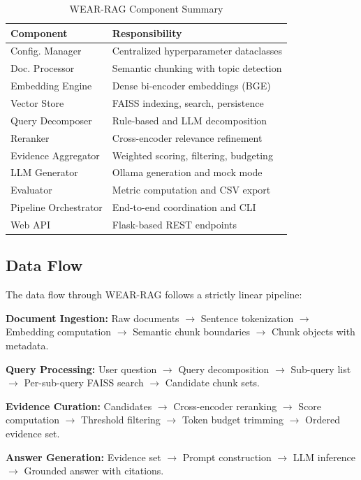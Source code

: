 \documentclass[conference]{IEEEtran}
\begin{document}
\begin{table}[!ht]
\centering
\caption{WEAR-RAG Component Summary}
\label{tab:modules}
\footnotesize
\begin{tabular}{p{2.2cm} p{4.8cm}}
\toprule
\textbf{Component} & \textbf{Responsibility} \\
\midrule
Config. Manager & Centralized hyperparameter dataclasses \\
Doc. Processor & Semantic chunking with topic detection \\
Embedding Engine & Dense bi-encoder embeddings (BGE) \\
Vector Store & FAISS indexing, search, persistence \\
Query Decomposer & Rule-based and LLM decomposition \\
Reranker & Cross-encoder relevance refinement \\
Evidence Aggregator & Weighted scoring, filtering, budgeting \\
LLM Generator & Ollama generation and mock mode \\
Evaluator & Metric computation and CSV export \\
Pipeline Orchestrator & End-to-end coordination and CLI \\
Web API & Flask-based REST endpoints \\
\bottomrule
\end{tabular}
\end{table}

\subsection{Data Flow}

The data flow through WEAR-RAG follows a strictly linear pipeline:

\noindent\textbf{Document Ingestion:} Raw documents $\rightarrow$ Sentence tokenization $\rightarrow$ Embedding computation $\rightarrow$ Semantic chunk boundaries $\rightarrow$ Chunk objects with metadata.

\noindent\textbf{Query Processing:} User question $\rightarrow$ Query decomposition $\rightarrow$ Sub-query list $\rightarrow$ Per-sub-query FAISS search $\rightarrow$ Candidate chunk sets.

\noindent\textbf{Evidence Curation:} Candidates $\rightarrow$ Cross-encoder reranking $\rightarrow$ Score computation $\rightarrow$ Threshold filtering $\rightarrow$ Token budget trimming $\rightarrow$ Ordered evidence set.

\noindent\textbf{Answer Generation:} Evidence set $\rightarrow$ Prompt construction $\rightarrow$ LLM inference $\rightarrow$ Grounded answer with citations.
\end{document}
